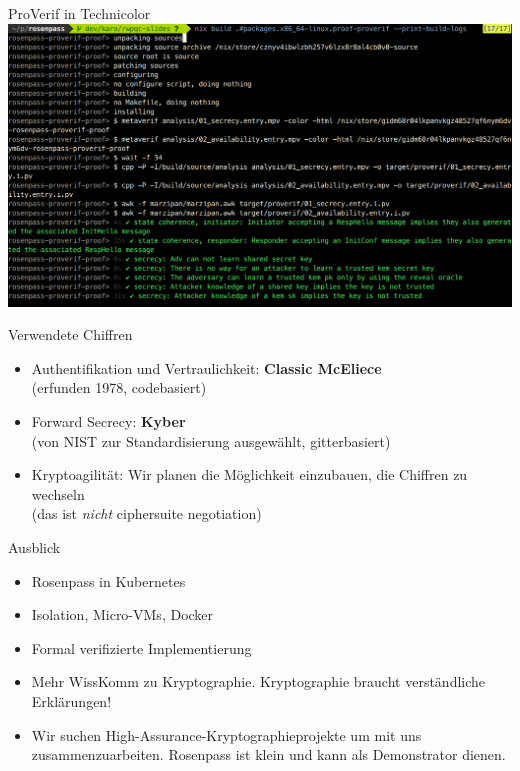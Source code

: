\documentclass[german]{rosenpass-beamer}
\begin{document}
\begin{frame}{ProVerif in Technicolor}
  \includegraphics[height=.9\textheight]{assets/2023-03-20-symbolic-analysis-screenshot.png}
\end{frame}



\begin{frame}{Verwendete Chiffren}
  \begin{itemize}
    \item Authentifikation und Vertraulichkeit: \textbf{Classic McEliece}\\
	    (erfunden 1978, codebasiert)
    \item Forward Secrecy: \textbf{Kyber}\\
	    (von NIST zur Standardisierung ausgewählt, gitterbasiert)
    \item Kryptoagilität: Wir planen die Möglichkeit einzubauen, die Chiffren zu wechseln\\
	    (das ist \emph{nicht} ciphersuite negotiation)
  \end{itemize}
\end{frame}

\begin{frame}{Ausblick}
  \begin{itemize}
    \item Rosenpass in Kubernetes
    \item Isolation, Micro-VMs, Docker
    \item Formal verifizierte Implementierung
  \end{itemize}
  \begin{itemize}
    \item Mehr WissKomm zu Kryptographie. Kryptographie braucht verständliche Erklärungen!
  \end{itemize}
  \begin{itemize}
    \item Wir suchen High-Assurance-Kryptographieprojekte um mit uns zusammenzuarbeiten. Rosenpass ist klein und kann als Demonstrator dienen.
  \end{itemize}
\end{frame}
\end{document}
